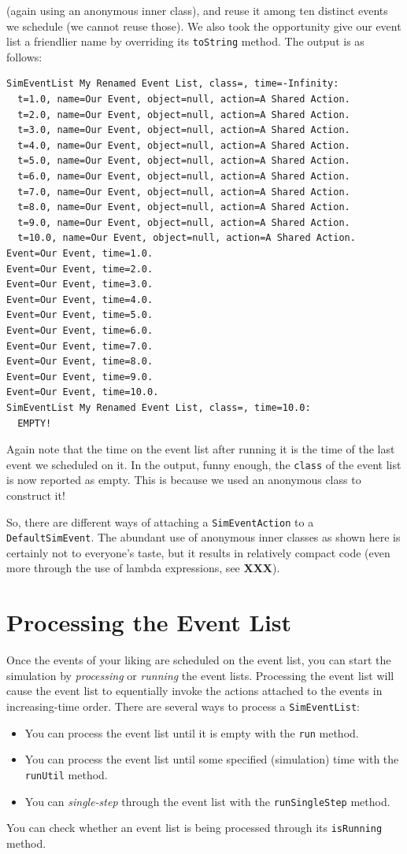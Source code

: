 \documentclass[12pt]{book}
\begin{document}
  (again using an anonymous inner class),
  and reuse it among ten distinct events we schedule
  (we cannot reuse those).
We also took the opportunity give our
  event list a friendlier name by overriding its \lstinline{toString} method.
The output is as follows:
\begin{lstlisting}[basicstyle=\tiny]
SimEventList My Renamed Event List, class=, time=-Infinity:
  t=1.0, name=Our Event, object=null, action=A Shared Action.
  t=2.0, name=Our Event, object=null, action=A Shared Action.
  t=3.0, name=Our Event, object=null, action=A Shared Action.
  t=4.0, name=Our Event, object=null, action=A Shared Action.
  t=5.0, name=Our Event, object=null, action=A Shared Action.
  t=6.0, name=Our Event, object=null, action=A Shared Action.
  t=7.0, name=Our Event, object=null, action=A Shared Action.
  t=8.0, name=Our Event, object=null, action=A Shared Action.
  t=9.0, name=Our Event, object=null, action=A Shared Action.
  t=10.0, name=Our Event, object=null, action=A Shared Action.
Event=Our Event, time=1.0.
Event=Our Event, time=2.0.
Event=Our Event, time=3.0.
Event=Our Event, time=4.0.
Event=Our Event, time=5.0.
Event=Our Event, time=6.0.
Event=Our Event, time=7.0.
Event=Our Event, time=8.0.
Event=Our Event, time=9.0.
Event=Our Event, time=10.0.
SimEventList My Renamed Event List, class=, time=10.0:
  EMPTY!
\end{lstlisting}
Again note that the time on the event list after running it
  is the time of the last event we scheduled on it.
In the output, funny enough, the \lstinline{class} of the event list
  is now reported as empty.
This is because we used an anonymous class to construct it!

So, there are different ways of attaching a \lstinline{SimEventAction}
  to a \lstinline{DefaultSimEvent}.
The abundant use of anonymous inner classes as shown here
  is certainly not to everyone's taste,
  but it results in relatively compact code
  (even more through the use of lambda expressions, see {\bf XXX}).

\section{Processing the Event List}

Once the events of your liking are scheduled on the event list,
  you can start the simulation by {\em processing\/} or {\em running\/}
  the event lists.
Processing the event list will cause the event list to
  equentially invoke the actions attached to the events
  in increasing-time order.
There are several ways to process a \lstinline{SimEventList}:
\begin{itemize}
  \item You can process the event list until it is empty with the \lstinline{run} method.
  \item You can process the event list until some specified (simulation) time with the
          \lstinline{runUtil} method.
  \item You can {\em single-step\/} through the event list with the
          \lstinline{runSingleStep} method.
\end{itemize}
You can check whether an event list is being processed through its \lstinline{isRunning}
  method.
\end{document}
